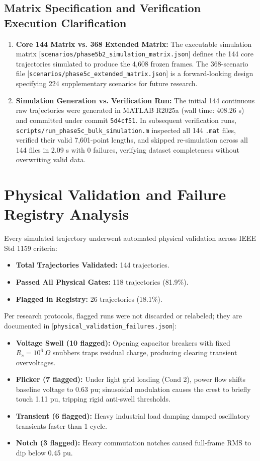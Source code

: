 \documentclass[12pt,a4paper]{report}
\begin{document}
\subsection{Matrix Specification and Verification Execution Clarification}
\begin{enumerate}
    \item \textbf{Core 144 Matrix vs. 368 Extended Matrix:} The executable simulation matrix [\texttt{scenarios/phase5b2\_simulation\_matrix.json}] defines the 144 core trajectories simulated to produce the 4,608 frozen frames. The 368-scenario file [\texttt{scenarios/phase5c\_extended\_matrix.json}] is a forward-looking design specifying 224 supplementary scenarios for future research.
    \item \textbf{Simulation Generation vs. Verification Run:} The initial 144 continuous raw trajectories were generated in MATLAB R2025a (wall time: 408.26 s) and committed under commit \texttt{5d4cf51}. In subsequent verification runs, \texttt{scripts/run\_phase5c\_bulk\_simulation.m} inspected all 144 \texttt{.mat} files, verified their valid 7,601-point lengths, and skipped re-simulation across all 144 files in 2.09 s with 0 failures, verifying dataset completeness without overwriting valid data.
\end{enumerate}

\section{Physical Validation and Failure Registry Analysis}
Every simulated trajectory underwent automated physical validation across IEEE Std 1159 criteria:
\begin{itemize}
    \item \textbf{Total Trajectories Validated:} 144 trajectories.
    \item \textbf{Passed All Physical Gates:} 118 trajectories (81.9\%).
    \item \textbf{Flagged in Registry:} 26 trajectories (18.1\%).
\end{itemize}
Per research protocols, flagged runs were not discarded or relabeled; they are documented in [\texttt{physical\_validation\_failures.json}]:
\begin{itemize}
    \item \textbf{Voltage Swell (10 flagged):} Opening capacitor breakers with fixed $R_s = 10^6\ \Omega$ snubbers traps residual charge, producing clearing transient overvoltages.
    \item \textbf{Flicker (7 flagged):} Under light grid loading (Cond 2), power flow shifts baseline voltage to 0.63 pu; sinusoidal modulation causes the crest to briefly touch 1.11 pu, tripping rigid anti-swell thresholds.
    \item \textbf{Transient (6 flagged):} Heavy industrial load damping damped oscillatory transients faster than 1 cycle.
    \item \textbf{Notch (3 flagged):} Heavy commutation notches caused full-frame RMS to dip below 0.45 pu.
\end{itemize}
\end{document}
